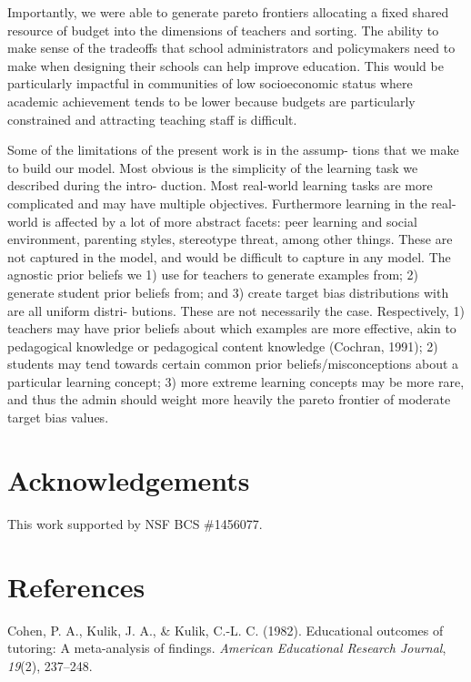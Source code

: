 \documentclass[10pt, letterpaper]{article}
\begin{document}
Importantly, we were able to generate pareto frontiers allocating a
fixed shared resource of budget into the dimensions of teachers and
sorting. The ability to make sense of the tradeoffs that school
administrators and policymakers need to make when designing their
schools can help improve education. This would be particularly impactful
in communities of low socioeconomic status where academic achievement
tends to be lower because budgets are particularly constrained and
attracting teaching staff is difficult.

Some of the limitations of the present work is in the assump- tions that
we make to build our model. Most obvious is the simplicity of the
learning task we described during the intro- duction. Most real-world
learning tasks are more complicated and may have multiple objectives.
Furthermore learning in the real-world is affected by a lot of more
abstract facets: peer learning and social environment, parenting styles,
stereotype threat, among other things. These are not captured in the
model, and would be difficult to capture in any model. The agnostic
prior beliefs we 1) use for teachers to generate examples from; 2)
generate student prior beliefs from; and 3) create target bias
distributions with are all uniform distri- butions. These are not
necessarily the case. Respectively, 1) teachers may have prior beliefs
about which examples are more effective, akin to pedagogical knowledge
or pedagogical content knowledge (Cochran, 1991); 2) students may tend
towards certain common prior beliefs/misconceptions about a particular
learning concept; 3) more extreme learning concepts may be more rare,
and thus the admin should weight more heavily the pareto frontier of
moderate target bias values.

\section{Acknowledgements}\label{acknowledgements}

This work supported by NSF BCS \#1456077.

\section{References}\label{references}

\setlength{\parindent}{-0.1in} \setlength{\leftskip}{0.125in} \noindent

\hypertarget{refs}{}
\hypertarget{ref-cohen1982}{}
Cohen, P. A., Kulik, J. A., \& Kulik, C.-L. C. (1982). Educational
outcomes of tutoring: A meta-analysis of findings. \emph{American
Educational Research Journal}, \emph{19}(2), 237--248.
\end{document}
